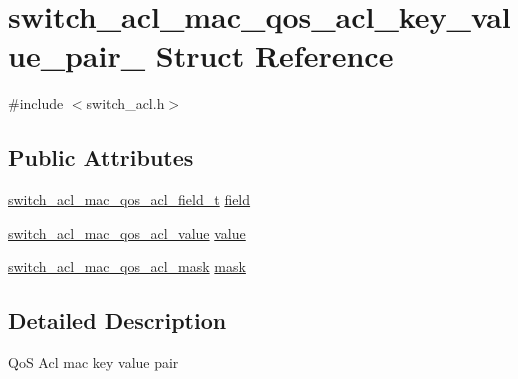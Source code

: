 \hypertarget{structswitch__acl__mac__qos__acl__key__value__pair__}{\section{switch\+\_\+acl\+\_\+mac\+\_\+qos\+\_\+acl\+\_\+key\+\_\+value\+\_\+pair\+\_\+ Struct Reference}
\label{structswitch__acl__mac__qos__acl__key__value__pair__}
}


{\ttfamily \#include $<$switch\+\_\+acl.\+h$>$}

\subsection*{Public Attributes}
\begin{DoxyCompactItemize}
\item 
\hyperlink{group__ACL_gaf6ac582ebd67bbb370eaa31e056673ed}{switch\+\_\+acl\+\_\+mac\+\_\+qos\+\_\+acl\+\_\+field\+\_\+t} \hyperlink{structswitch__acl__mac__qos__acl__key__value__pair___a677a05f6151851ae711e707dcaac0dcc}{field}
\item 
\hyperlink{group__ACL_gadccedff518f9535942f1b44892d34606}{switch\+\_\+acl\+\_\+mac\+\_\+qos\+\_\+acl\+\_\+value} \hyperlink{structswitch__acl__mac__qos__acl__key__value__pair___abfc569e14c4dd1420298b0983d318d46}{value}
\item 
\hyperlink{group__ACL_ga5d9712a348fc935b7b85f24e1eb59c44}{switch\+\_\+acl\+\_\+mac\+\_\+qos\+\_\+acl\+\_\+mask} \hyperlink{structswitch__acl__mac__qos__acl__key__value__pair___a92f434dac2744c188b8d2e9c6c5e6a0d}{mask}
\end{DoxyCompactItemize}


\subsection{Detailed Description}
Qo\+S Acl mac key value pair 

